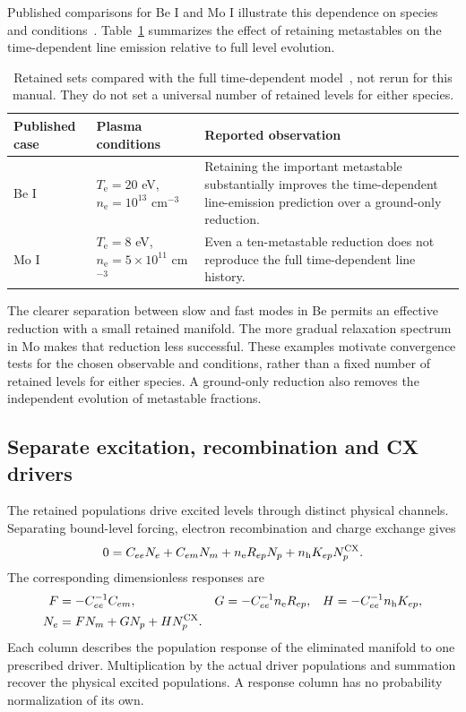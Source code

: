 \documentclass[11pt,a4paper]{article}
\newcommand{\nelec}{n_{\mathrm e}}
\newcommand{\nh}{n_{\mathrm h}}
\newcommand{\Te}{T_{\mathrm e}}
\numberwithin{equation}{section}
\begin{document}
Published comparisons for Be I and Mo I illustrate this dependence on
species and conditions~\cite{johnson}. Table~\ref{tab:manifolds}
summarizes the effect of retaining metastables on the time-dependent
line emission relative to full level evolution.

\begin{table}[htbp]\centering\small
\begin{tabularx}{\textwidth}{l l X}
\toprule Published case & Plasma conditions & Reported observation\\\midrule
Be I & $\Te=20$ eV, $\nelec=10^{13}$ cm$^{-3}$ &
Retaining the important metastable substantially improves the time-dependent
line-emission prediction over a ground-only reduction.\\
Mo I & $\Te=8$ eV, $\nelec=5\times10^{11}$ cm$^{-3}$ &
Even a ten-metastable reduction does not reproduce the full
time-dependent line history.\\
\bottomrule
\end{tabularx}
\caption{Retained sets compared with the full time-dependent
model~\cite{johnson}, not rerun for this manual. They do not set a universal
number of retained levels for either species.}\label{tab:manifolds}
\end{table}

The clearer separation between slow and fast modes in Be permits an
effective reduction with a small retained manifold. The more gradual
relaxation spectrum in Mo makes that reduction less successful.
These examples motivate convergence tests for the chosen observable
and conditions, rather than a fixed number of retained levels for
either species. A ground-only reduction also removes the independent
evolution of metastable fractions.

\subsection{Separate excitation, recombination and CX drivers}\label{sec:cxdrivers}

The retained populations drive excited levels through distinct physical
channels. Separating bound-level forcing, electron recombination and
charge exchange gives
\begin{equation}
 0=C_{ee}N_e+C_{e m}N_m+\nelec R_{e p}N_p
                                +\nh K_{e p}N_p^{\rm CX}.
\end{equation}
The corresponding dimensionless responses are
\begin{align}
 F&=-C_{ee}^{-1}C_{em}, &
 G&=-C_{ee}^{-1}\nelec R_{ep}, &
 H&=-C_{ee}^{-1}\nh K_{ep},\label{eq:responses}\\
 N_e&=FN_m+GN_p+HN_p^{\rm CX}.\nonumber
\end{align}
Each column describes the population response of the eliminated manifold
to one prescribed driver. Multiplication by the actual driver populations
and summation recover the physical excited populations. A response
column has no probability normalization of its own.
\end{document}
